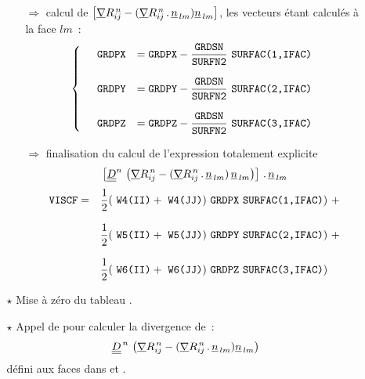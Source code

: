 \begin{itemize}
\begin{itemize}
\begin{itemize}
\item [$\Rightarrow$] calcul de
 $\left[\underline{\nabla}{R^{\,n}_{ij}} - (\underline{\nabla}
R^{\,n}_{ij}\,.\,\underline{n}_{\,lm})\underline{n}_{\,lm}\right]$, les vecteurs étant
calculés à la face $lm$~:
\begin{equation}\notag
\left\{\begin{array}{lll}
&\displaystyle \text{\texttt{GRDPX}} &= \text{\texttt{GRDPX}} - \displaystyle\frac{\text{\texttt{GRDSN}}}{\text{\texttt{SURFN2}}} \ \text{\texttt{SURFAC(1,IFAC)}}\\
&&\\
&\displaystyle \text{\texttt{GRDPY}} &= \text{\texttt{GRDPY}} - \displaystyle\frac{\text{\texttt{GRDSN}}}{\text{\texttt{SURFN2}}} \ \text{\texttt{SURFAC(2,IFAC)}} \\
&&\\
&\displaystyle \text{\texttt{GRDPZ}} &= \text{\texttt{GRDPZ}} - \displaystyle\frac{\text{\texttt{GRDSN}}}{\text{\texttt{SURFN2}}} \ \text{\texttt{SURFAC(3,IFAC)}}
\end{array}\right.
\end{equation}
\item [$\Rightarrow$] finalisation du calcul de l'expression totalement
explicite
 $$\left[ \underline{\underline{D}}^n\,\left( \underline{\nabla}{R^{\,n}_{ij}} - (\underline{\nabla} R^{\,n}_{ij}\,.\,\underline{n}_{\,lm})\,\underline{n}_{\,lm}\right) \right]\,.\,\underline{n}_{\,lm}$$
\begin{equation}\notag
\begin{array} {ll}
\displaystyle \var{VISCF} = &
 \displaystyle\frac{1}{2} (\ \var{W4(II)} +\ \var{W4(JJ)}) \ \var{GRDPX} \
\var{SURFAC(1,IFAC)})\ + \\
&\\
&  \displaystyle\frac{1}{2} (\ \var{W5(II)} +\ \var{W5(JJ)}) \ \var{GRDPY} \
\var{SURFAC(2,IFAC)})\ + \\
&\\
&  \displaystyle\frac{1}{2} (\ \var{W6(II)} +\ \var{W6(JJ)}) \ \var{GRDPZ} \ \var{SURFAC(3,IFAC)})
\end{array}
\end{equation}
\end{itemize}

\item [$\star$] Mise à zéro du tableau .

\item [$\star$] Appel de  pour calculer la divergence de~:
 $$\underline{\underline{D}}^{\,n}\,\left( \underline{\nabla}{R^{\,n}_{ij}} - (\underline{\nabla} R^{\,n}_{ij}\,.\,\underline{n}_{\,lm})\underline{n}_{\,lm}\right)$$ défini aux faces dans  et .


\end{itemize}
\end{itemize}
